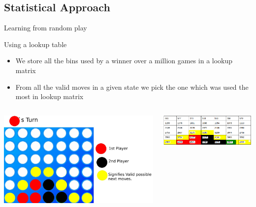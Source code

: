 \documentclass{beamer}
\begin{document}
\subsection{Statistical Approach} 
\begin{frame}{Learning from random play}

\begin{block}{Using a lookup table}


\begin{itemize}
 \item We store all the bins used by a winner over a million games in a lookup matrix
 \item From all the valid moves in a given state we pick the one which was used the most in lookup matrix 

\end{itemize}

\end{block}
    \begin{columns}
	 	\begin{column}{0.4\textwidth}
			
			\includegraphics[scale = 0.08]{valid.jpeg}
	 	\end{column}
 		\begin{column}{0.5\textwidth}
			
			\includegraphics[scale = 0.40]{table.png}	
	 	\end{column}
	 \end{columns}
\end{frame}
\end{document}
